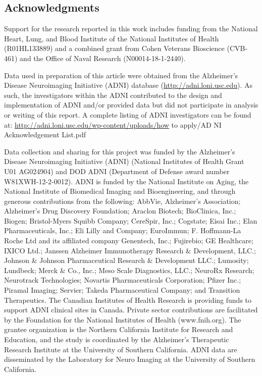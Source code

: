 \documentclass[12pt,]{article}
\begin{document}
\clearpage

\hypertarget{acknowledgments}{%
\subsection*{Acknowledgments}\label{acknowledgments}}

Support for the research reported in this work includes funding from the
National Heart, Lung, and Blood Institute of the National Institutes of
Health (R01HL133889) and a combined grant from Cohen Veterans Bioscience
(CVB-461) and the Office of Naval Research (N00014-18-1-2440).

Data used in preparation of this article were obtained from the
Alzheimer's Disease Neuroimaging Initiative (ADNI) database
(\url{http://adni.loni.usc.edu}). As such, the investigators within the
ADNI contributed to the design and implementation of ADNI and/or
provided data but did not participate in analysis or writing of this
report. A complete listing of ADNI investigators can be found at:
\url{http://adni.loni.usc.edu/wp-content/uploads/how} to apply/AD NI
Acknowledgement List.pdf

Data collection and sharing for this project was funded by the
Alzheimer's Disease Neuroimaging Initiative (ADNI) (National Institutes
of Health Grant U01 AG024904) and DOD ADNI (Department of Defense award
number W81XWH-12-2-0012). ADNI is funded by the National Institute on
Aging, the National Institute of Biomedical Imaging and Bioengineering,
and through generous contributions from the following: AbbVie,
Alzheimer's Association; Alzheimer's Drug Discovery Foundation; Araclon
Biotech; BioClinica, Inc.; Biogen; Bristol-Myers Squibb Company;
CereSpir, Inc.; Cogstate; Eisai Inc.; Elan Pharmaceuticals, Inc.; Eli
Lilly and Company; EuroImmun; F. Hoffmann-La Roche Ltd and its
affiliated company Genentech, Inc.; Fujirebio; GE Healthcare; IXICO
Ltd.; Janssen Alzheimer Immunotherapy Research \& Development, LLC.;
Johnson \& Johnson Pharmaceutical Research \& Development LLC.;
Lumosity; Lundbeck; Merck \& Co., Inc.; Meso Scale Diagnostics, LLC.;
NeuroRx Research; Neurotrack Technologies; Novartis Pharmaceuticals
Corporation; Pfizer Inc.; Piramal Imaging; Servier; Takeda
Pharmaceutical Company; and Transition Therapeutics. The Canadian
Institutes of Health Research is providing funds to support ADNI
clinical sites in Canada. Private sector contributions are facilitated
by the Foundation for the National Institutes of Health (www.fnih.org).
The grantee organization is the Northern California Institute for
Research and Education, and the study is coordinated by the Alzheimer's
Therapeutic Research Institute at the University of Southern California.
ADNI data are disseminated by the Laboratory for Neuro Imaging at the
University of Southern California. \newpage
\end{document}
